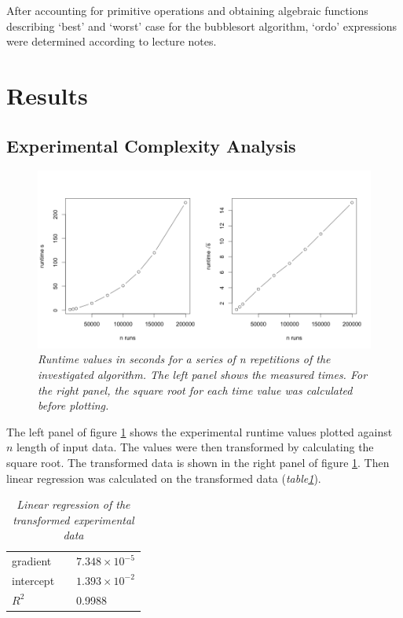 \documentclass[a4paper,11pt,twoside]{article}
\begin{document}
After accounting for primitive operations and obtaining algebraic
functions describing `best' and `worst' case for the bubblesort algorithm, 
`ordo' expressions were determined according to lecture notes. 


\section{Results}
\subsection{Experimental Complexity Analysis}

\begin{figure} 
\includegraphics[width=\textwidth]{graph1.png}
\caption{\textit{Runtime values in seconds for a series of \textit{n}
  repetitions of the investigated algorithm. The left panel shows the
  measured times. For the right panel, the square root for each time
  value was calculated before plotting.}\label{ls:bubble}}
\label{fig:graph}
\end{figure}

The left panel of figure \ref{fig:graph} shows the experimental
runtime values plotted against $n$ length of input data. The values
were then transformed by calculating the square root. The 
transformed data is shown in the right panel of figure 
\ref{fig:graph}. Then linear regression was calculated on the
transformed data (\textit{table\ref{tab:regression}}).

\begin{table}[]
\caption{\textit{Linear regression of the transformed experimental data}}
\label{tab:regression}
\begin{tabular}{lll}

gradient &  & $7.348 \times 10^{-5}$ \\
intercept &  & $1.393 \times 10^{-2}$ \\
$R^2$ &  & 0.9988 \\ 
\end{tabular}
\end{table}
\end{document}
